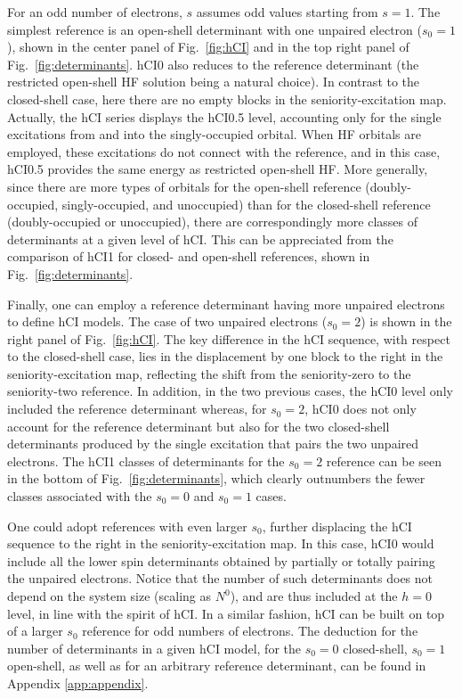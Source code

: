 \documentclass[aip,jcp,reprint,noshowkeys,superscriptaddress]{revtex4-1}
\begin{document}
For an odd number of electrons, $s$ assumes odd values starting from $s=1$.
The simplest reference is an open-shell determinant with one unpaired electron ($s_0=1$), shown in the center panel of Fig.~\ref{fig:hCI} and in the top right panel of Fig.~\ref{fig:determinants}.
hCI0 also reduces to the reference determinant (the restricted open-shell HF solution being a natural choice).
In contrast to the closed-shell case, here there are no empty blocks in the seniority-excitation map.
Actually, the hCI series displays the hCI0.5 level, accounting only for the single excitations from and into the singly-occupied orbital.
When HF orbitals are employed, these excitations do not connect with the reference, and in this case, hCI0.5 provides the same energy as restricted open-shell HF.
More generally, since there are more types of orbitals for the open-shell reference (doubly-occupied, singly-occupied, and unoccupied) than for the closed-shell reference (doubly-occupied or unoccupied),
there are correspondingly more classes of determinants at a given level of hCI.
This can be appreciated from the comparison of hCI1 for closed- and open-shell references, shown in Fig.~\ref{fig:determinants}.

Finally, one can employ a reference determinant having more unpaired electrons to define hCI models.
The case of two unpaired electrons ($s_0=2$) is shown in the right panel of Fig.~\ref{fig:hCI}.
The key difference in the hCI sequence, with respect to the closed-shell case, lies in the displacement by one block to the right in the seniority-excitation map,
reflecting the shift from the seniority-zero to the seniority-two reference.
In addition, in the two previous cases, the hCI0 level only included the reference determinant
whereas, for $s_0=2$, hCI0 does not only account for the reference determinant
but also for the two closed-shell determinants produced by the single excitation that pairs the two unpaired electrons.
The hCI1 classes of determinants for the $s_0=2$ reference can be seen in the bottom of Fig.~\ref{fig:determinants},
which clearly outnumbers the fewer classes associated with the $s_0=0$ and $s_0=1$ cases.

One could adopt references with even larger $s_0$, further displacing the hCI sequence to the right in the seniority-excitation map.
In this case, hCI0 would include all the lower spin determinants obtained by partially or totally pairing the unpaired electrons.
Notice that the number of such determinants does not depend on the system size (scaling as $N^0$), and are thus included at the $h=0$ level, in line with the spirit of hCI.
In a similar fashion, hCI can be built on top of a larger $s_0$ reference for odd numbers of electrons.
The deduction for the number of determinants in a given hCI model, for the $s_0=0$ closed-shell, $s_0=1$ open-shell, as well as for an arbitrary reference determinant, can be found in Appendix \ref{app:appendix}.
\end{document}
